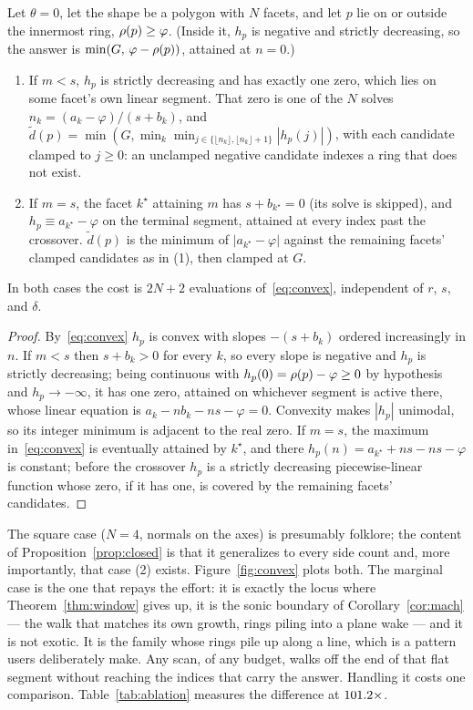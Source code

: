 \begin{proposition}
\label{prop:closed}
Let $\theta=0$, let the shape be a polygon with $N$ facets, and let $p$ lie on
or outside the innermost ring, $\rho(p)\ge\varphi$. (Inside it, $h_p$ is
negative and strictly decreasing, so the answer is
$\min(G,\,\varphi-\rho(p))$, attained at $n=0$.)
\begin{enumerate}
  \item If $m < s$, $h_p$ is strictly decreasing and has exactly one zero, which
  lies on some facet's own linear segment. That zero is one of the $N$ solves
  $n_k = (a_k-\varphi)/(s+b_k)$, and
  $\tilde d(p) = \min(G,\min_k \min_{j\in\{\lfloor n_k\rfloor, \lfloor n_k\rfloor+1\}} |h_p(j)|)$,
  with each candidate clamped to $j\ge0$: an unclamped negative candidate
  indexes a ring that does not exist.
  \item If $m = s$, the facet $k^\star$ attaining $m$ has $s + b_{k^\star} = 0$
  (its solve is skipped), and $h_p \equiv a_{k^\star} - \varphi$ on the terminal
  segment, attained at every index past the crossover. $\tilde d(p)$ is the
  minimum of $|a_{k^\star}-\varphi|$ against the remaining facets' clamped
  candidates as in (1), then clamped at $G$.
\end{enumerate}
In both cases the cost is $2N+2$ evaluations of~\eqref{eq:convex}, independent of
$r$, $s$, and $\delta$.
\end{proposition}

\begin{proof}
By~\eqref{eq:convex} $h_p$ is convex with slopes $-(s+b_k)$ ordered increasingly
in $n$. If $m<s$ then $s + b_k > 0$ for every $k$, so every slope is negative and
$h_p$ is strictly decreasing; being continuous with $h_p(0)=\rho(p)-\varphi\ge0$
by hypothesis and $h_p\to-\infty$, it has one zero, attained
on whichever segment is active there, whose linear equation is
$a_k - nb_k - ns - \varphi = 0$. Convexity makes $|h_p|$ unimodal, so its integer
minimum is adjacent to the real zero. If $m=s$, the maximum in~\eqref{eq:convex}
is eventually attained by $k^\star$, and there
$h_p(n) = a_{k^\star} + ns - ns - \varphi$ is constant; before the crossover
$h_p$ is a strictly decreasing piecewise-linear function whose zero, if it has
one, is covered by the remaining facets' candidates.
\end{proof}

The square case ($N=4$, normals on the axes) is presumably folklore; the content
of Proposition~\ref{prop:closed} is that it generalizes to every side count
and, more importantly, that case (2) exists.
Figure~\ref{fig:convex} plots both. The marginal case is the one that repays the
effort: it is exactly the locus where Theorem~\ref{thm:window} gives up, it is
the sonic boundary of Corollary~\ref{cor:mach} --- the walk that matches its
own growth, rings piling into a plane wake --- and it is
not exotic. It is the family whose rings pile up along a line, which is a
pattern users deliberately make. Any scan, of any budget, walks off the end of
that flat segment without reaching the indices that carry the answer. Handling it
costs one comparison. Table~\ref{tab:ablation} measures the difference at
$101.2\times$.

